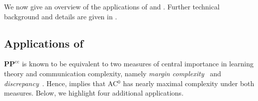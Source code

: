 \documentclass{toc}
\newcommand{\PPcc}{\mathbf{PP}^{\text{cc}}}
\begin{document}
We now give an overview of the applications of  and . Further technical background and details are given in .

\vspace{-3mm}
\subsection{Applications of }

$\PPcc$ is known to be equivalent to two measures of central importance in 
learning theory and communication complexity, namely \emph{margin complexity}~\cite{linial2009learning} and \emph{discrepancy}~\cite{klauck2001lower}.
Hence,
 implies that AC$^0$ has nearly maximal complexity under both measures. Below,
we highlight four additional applications. 
\end{document}
